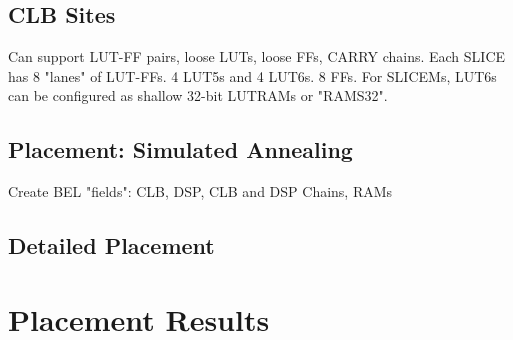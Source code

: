 \documentclass[twocolumn]{article}
\begin{document}
        \subsection{CLB Sites}
            Can support LUT-FF pairs, loose LUTs, loose FFs, CARRY chains.
            Each SLICE has 8 "lanes" of LUT-FFs. 4 LUT5s and 4 LUT6s. 8 FFs.
            For SLICEMs, LUT6s can be configured as shallow 32-bit LUTRAMs or "RAMS32".
    \subsection{Placement: Simulated Annealing}
        Create BEL "fields": CLB, DSP, CLB and DSP Chains, RAMs

        \subsection{Detailed Placement}

\section{Placement Results}
\end{document}
